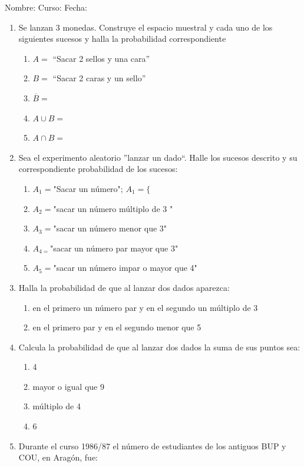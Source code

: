 \documentclass[fleqn]{article}
\newcommand{\LineaNombre}{%
\par
\vspace{\baselineskip}
Nombre:\hrulefill \; Curso: \underline{\hspace*{48pt}} \; Fecha: \underline{\hspace*{2.5cm}} \relax
\par}
\begin{document}
\LineaNombre
\begin{enumerate}
 \item Se lanzan 3 monedas. Construye el espacio muestral y cada uno de los siguientes sucesos y halla la probabilidad correspondiente
 \begin{enumerate}
 \item $A=$ ``Sacar 2 sellos y una cara'' \noanswer
 \item $B=$ ``Sacar 2 caras y un sello'' \noanswer
 \item $\overline{B}=$ \noanswer
 \item $A\cup B=$ \noanswer
 \item $A\cap B=$ \noanswer
 \end{enumerate}
 \item Sea el experimento aleatorio ''lanzar un dado``. Halle los sucesos descrito y su correspondiente probabilidad de los sucesos:
\begin{enumerate}
\item $A_{1}=$"Sacar un número"; $A_{1}=\{$ \noanswer
\item $A_{2}=$"sacar un número múltiplo de 3 " \noanswer
\item $A_{3}=$"sacar un número menor que 3" \noanswer
\item $A_{4=}$"sacar un número par mayor que 3" \noanswer
\item $A_{5}=$"sacar un número impar o mayor que 4"\noanswer
\end{enumerate}
  \newpage
\item Halla la probabilidad de que al lanzar dos dados aparezca:
\begin{enumerate}
 \item en el primero un número par y en el segundo un múltiplo de 3 \noanswer
 \item en el primero par y en el segundo menor que 5 \noanswer
\end{enumerate}
\item Calcula la probabilidad de que al lanzar dos dados la suma de sus puntos sea:
\begin{enumerate}
\item 4 \noanswer
\item mayor o igual que 9 \noanswer
\item múltiplo de 4 \noanswer
\item 6 \noanswer
\end{enumerate}
\item Durante el curso 1986/87 el número de estudiantes de los antiguos BUP y COU, en Aragón, fue:


\end{enumerate}
\end{document}
